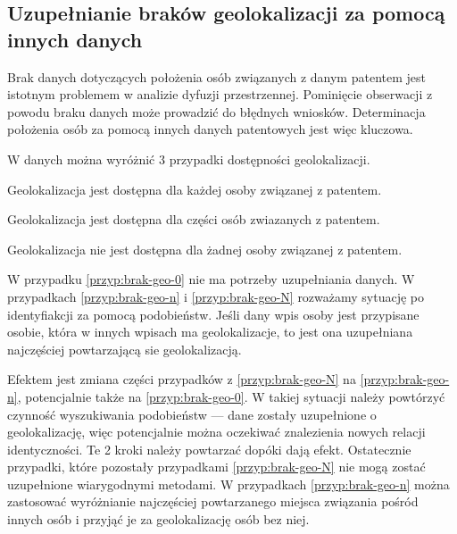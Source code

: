 \subsection{Uzupełnianie braków geolokalizacji za pomocą innych danych}

Brak danych dotyczących położenia osób związanych z danym patentem jest
istotnym problemem w analizie dyfuzji przestrzennej. Pominięcie obserwacji
z powodu braku danych może prowadzić do błędnych wniosków. 
Determinacja położenia osób za pomocą innych danych patentowych jest
więc kluczowa.

W danych można wyróżnić 3 przypadki dostępności geolokalizacji.

\begin{przyp}\label{przyp:brak-geo-0}
Geolokalizacja jest dostępna dla każdej osoby związanej z patentem.
\end{przyp}

\begin{przyp}\label{przyp:brak-geo-n}
Geolokalizacja jest dostępna dla części osób zwiazanych z patentem.
\end{przyp}

\begin{przyp}\label{przyp:brak-geo-N}
Geolokalizacja nie jest dostępna dla żadnej osoby związanej z patentem.
\end{przyp}

W przypadku \ref{przyp:brak-geo-0} nie ma potrzeby uzupełniania danych.
W przypadkach \ref{przyp:brak-geo-n} i \ref{przyp:brak-geo-N} 
rozważamy sytuację po identyfiakcji za pomocą podobieństw. 
Jeśli dany wpis osoby jest przypisane osobie, 
która w innych wpisach ma geolokalizacje, to jest ona uzupełniana
najczęściej powtarzającą sie geolokalizacją.

Efektem jest zmiana części przypadków z \ref{przyp:brak-geo-N} na
\ref{przyp:brak-geo-n}, potencjalnie także na \ref{przyp:brak-geo-0}.
W takiej sytuacji należy powtórzyć czynność wyszukiwania podobieństw ---
dane zostały uzupełnione o geolokalizację, więc potencjalnie można
oczekiwać znalezienia nowych relacji identyczności.
Te 2 kroki należy powtarzać dopóki dają efekt. Ostatecznie
przypadki, które pozostały przypadkami \ref{przyp:brak-geo-N}
nie mogą zostać uzupełnione wiarygodnymi metodami.
W przypadkach \ref{przyp:brak-geo-n} można zastosować wyróżnianie
najczęściej powtarzanego miejsca związania pośród innych osób i przyjąć
je za geolokalizację osób bez niej.
